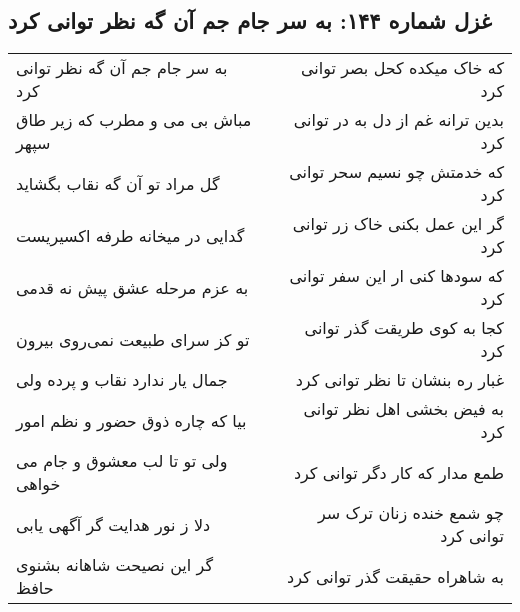 \begin{center}
\section*{غزل شماره ۱۴۴: به سر جام جم آن گه نظر توانی کرد}
\label{sec:sh144}
\begin{longtable}{l p{0.5cm} r}
به سر جام جم آن گه نظر توانی کرد
&&
که خاک میکده کحل بصر توانی کرد
\\
مباش بی می و مطرب که زیر طاق سپهر
&&
بدین ترانه غم از دل به در توانی کرد
\\
گل مراد تو آن گه نقاب بگشاید
&&
که خدمتش چو نسیم سحر توانی کرد
\\
گدایی در میخانه طرفه اکسیریست
&&
گر این عمل بکنی خاک زر توانی کرد
\\
به عزم مرحله عشق پیش نه قدمی
&&
که سودها کنی ار این سفر توانی کرد
\\
تو کز سرای طبیعت نمی‌روی بیرون
&&
کجا به کوی طریقت گذر توانی کرد
\\
جمال یار ندارد نقاب و پرده ولی
&&
غبار ره بنشان تا نظر توانی کرد
\\
بیا که چاره ذوق حضور و نظم امور
&&
به فیض بخشی اهل نظر توانی کرد
\\
ولی تو تا لب معشوق و جام می خواهی
&&
طمع مدار که کار دگر توانی کرد
\\
دلا ز نور هدایت گر آگهی یابی
&&
چو شمع خنده زنان ترک سر توانی کرد
\\
گر این نصیحت شاهانه بشنوی حافظ
&&
به شاهراه حقیقت گذر توانی کرد
\\
\end{longtable}
\end{center}
